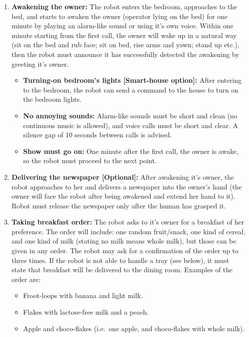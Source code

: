 \begin{enumerate}

\item \textbf{Awakening the owner:} The robot enters the bedroom, approaches to the bed, and starts to awaken the owner (operator lying on the bed) for one minute by playing an alarm-like sound or using it's own voice. Within one minute starting from the first call, the owner will wake up in a natural way (sit on the bed and rub face; sit on bed, rise arms and yawn; stand up etc.), then the robot must announce it has successfully detected the awakening by greeting it's owner.
\begin{itemize}
\item \textbf{Turning-on bedroom's lights [Smart-house option]:} After entering to the bedroom, the robot can send a command to the house to turn on the bedroom lights.
\item \textbf{No annoying sounds:} Alarm-like sounds must be short and clean (no continuous music is allowed), and voice calls must be short and clear. A silence gap of 10 seconds between calls is advised.
\item \textbf{Show must go on:} One minute after the first call, the owner is awake, so the robot must proceed to the next point.
\end{itemize}

\item \textbf{Delivering the newspaper [Optional]:} After awakening it's owner, the robot approaches to her and delivers a newspaper into the owner's hand (the owner will face the robot after being awakened and extend her hand to it). Robot must release the newspaper only after the human has grasped it.

\item \textbf{Taking breakfast order:} The robot asks to it's owner for a breakfast of her preference. The order will include: one random fruit/snack, one kind of cereal, and one kind of milk (stating no milk means whole milk), but those can be given in any order. The robot may ask for a confirmation of the order up to three times. If the robot is not able to handle a tray (see below), it must state that breakfast will be delivered to the dining room. Examples of the order are:

\begin{itemize}
\item Froot-loops with banana and light milk.
\item Flakes with lactose-free milk and a peach.
\item Apple and choco-flakes (i.e.~one apple, and choco-flakes with whole milk).
\end{itemize}


\end{enumerate}
